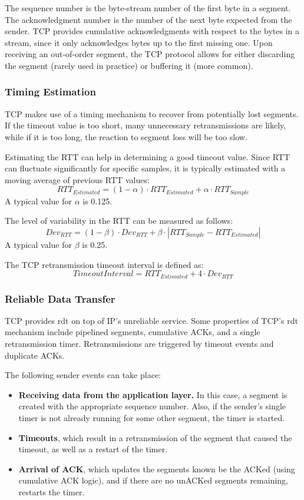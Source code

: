 \documentclass[12pt,titlepage]{article}
\begin{document}
        The sequence number is the byte-stream number of the first byte in a segment. The acknowledgment number is the number of the next byte expected from the sender. TCP provides
        cumulative acknowledgments with respect to the bytes in a stream, since it only acknowledges bytes up to the first missing one. Upon receiving an out-of-order segment, the 
        TCP protocol allows for either discarding the segment (rarely used in practice) or buffering it (more common).

      \subsubsection{Timing Estimation}
        TCP makes use of a timing mechanism to recover from potentially lost segments. If the timeout value is too short, many unnecessary retransmissions are likely, while if it is
        too long, the reaction to segment loss will be too slow.

        Estimating the RTT can help in determining a good timeout value. Since RTT can fluctuate significantly for specific samples, it is typically estimated with a moving average of
        previous RTT values:
        $$RTT_{Estimated} = (1 - \alpha) \cdot RTT_{Estimated} + \alpha \cdot RTT_{Sample}$$
        A typical value for $\alpha$ is 0.125.

        The level of variability in the RTT can be measured as follows:
        $$Dev_{RTT} = (1 - \beta) \cdot Dev_{RTT} + \beta \cdot |RTT_{Sample} - RTT_{Estimated}|$$
        A typical value for $\beta$ is 0.25.

        The TCP retransmission timeout interval is defined as:
        $$TimeoutInterval = RTT_{Estimated} + 4 \cdot Dev_{RTT}$$

      \subsubsection{Reliable Data Transfer}
        TCP provides rdt on top of IP's unreliable service. Some properties of TCP's rdt mechanism include pipelined segments, cumulative ACKs, and a single retransmission timer.
        Retransmissions are triggered by timeout events and duplicate ACKs.

        The following sender events can take place:
        \begin{itemize}
          \item \textbf{Receiving data from the application layer.} In this case, a segment is created with the appropriate sequence number. Also, if the sender's single timer is not
            already running for some other segment, the timer is started.
          \item \textbf{Timeouts}, which result in a retransmission of the segment that caused the timeout, as well as a restart of the timer.
          \item \textbf{Arrival of ACK}, which updates the segments known be the ACKed (using cumulative ACK logic), and if there are no unACKed segments remaining, restarts the timer.
        \end{itemize}
\end{document}
